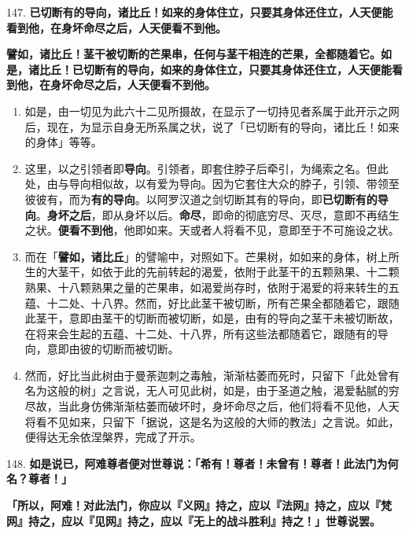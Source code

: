{\Large 147.} \textbf{已切断有的导向，诸比丘！如来的身体住立，只要其身体还住立，人天便能看到他，在身坏命尽之后，人天便看不到他。}

\textbf{譬如，诸比丘！茎干被切断的芒果串，任何与茎干相连的芒果，全都随着它。如是，诸比丘！已切断有的导向，如来的身体住立，只要其身体还住立，人天便能看到他，在身坏命尽之后，人天便看不到他。}

\begin{enumerate}\item 如是，由一切见为此六十二见所摄故，在显示了一切持见者系属于此开示之网后，现在，为显示自身无所系属之状，说了「已切断有的导向，诸比丘！如来的身体」等等。
\item 这里，以之引领者即\textbf{导向}。引领者，即套住脖子后牵引，为绳索之名。但此处，由与导向相似故，以有爱为导向。因为它套住大众的脖子，引领、带领至彼彼有，而为\textbf{有的导向}。以阿罗汉道之剑切断其有的导向，即\textbf{已切断有的导向}。\textbf{身坏之后}，即从身坏以后。\textbf{命尽}，即命的彻底穷尽、灭尽，意即不再结生之状。\textbf{便看不到他}，他即如来。天或者人将看不见，意即至于不可施设之状。
\item 而在「\textbf{譬如，诸比丘}」的譬喻中，对照如下。芒果树，如如来的身体，树上所生的大茎干，如依于此的先前转起的渴爱，依附于此茎干的五颗熟果、十二颗熟果、十八颗熟果之量的芒果串，如渴爱尚存时，依附于渴爱的将来转生的五蕴、十二处、十八界。然而，好比此茎干被切断，所有芒果全都随着它，跟随此茎干，意即由茎干的切断而被切断，如是，由有的导向之茎干未被切断故，在将来会生起的五蕴、十二处、十八界，所有这些法都随着它，跟随有的导向，意即由彼的切断而被切断。
\item 然而，好比当此树由于曼荼迦刺之毒触，渐渐枯萎而死时，只留下「此处曾有名为这般的树」之言说，无人可见此树，如是，由于圣道之触，渴爱黏腻的穷尽故，当此身仿佛渐渐枯萎而破坏时，身坏命尽之后，他们将看不见他，人天将看不见如来，只留下「据说，这是名为这般的大师的教法」之言说。如此，便得达无余依涅槃界，完成了开示。\end{enumerate}

{\Large 148.} \textbf{如是说已，阿难尊者便对世尊说：「希有！尊者！未曾有！尊者！此法门为何名？尊者！」}

\textbf{「所以，阿难！对此法门，你应以『义网』持之，应以『法网』持之，应以『梵网』持之，应以『见网』持之，应以『无上的战斗胜利』持之！」世尊说罢。}

